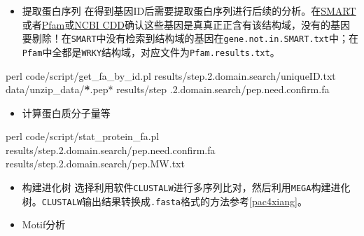\documentclass[
  10pt,
]{book}
\newenvironment{Shaded}{\begin{snugshade}}{\end{snugshade}}
\newcommand{\ErrorTok}[1]{\textcolor[rgb]{0.64,0.00,0.00}{\textbf{#1}}}
\newcommand{\FloatTok}[1]{\textcolor[rgb]{0.00,0.00,0.81}{#1}}
\newcommand{\NormalTok}[1]{#1}
\newcommand{\SpecialCharTok}[1]{\textcolor[rgb]{0.00,0.00,0.00}{#1}}
\providecommand{\tightlist}{%
  \setlength{\itemsep}{0pt}\setlength{\parskip}{0pt}}
\begin{document}
\begin{itemize}
\tightlist
\item
  提取蛋白序列
  在得到基因ID后需要提取蛋白序列进行后续的分析。在\href{http://smart.embl.de/}{SMART}或者\href{http://pfam.xfam.org/search}{Pfam}或\href{https://www.ncbi.nlm.nih.gov/cdd/}{NCBI CDD}确认这些基因是真真正正含有该结构域，没有的基因要剔除！在\texttt{SMART}中没有检索到结构域的基因在\texttt{gene.not.in.SMART.txt}中；在\texttt{Pfam}中全都是\texttt{WRKY}结构域，对应文件为\texttt{Pfam.results.txt}。
\end{itemize}

\begin{Shaded}
\begin{Highlighting}[]
\NormalTok{perl code}\SpecialCharTok{/}\NormalTok{script}\SpecialCharTok{/}\NormalTok{get\_fa\_by\_id.pl results}\SpecialCharTok{/}\NormalTok{step.}\FloatTok{2.}\NormalTok{domain.search}\SpecialCharTok{/}\NormalTok{uniqueID.txt data}\SpecialCharTok{/}\NormalTok{unzip\_data}\SpecialCharTok{/}\ErrorTok{*}\NormalTok{.pep}\SpecialCharTok{*}\NormalTok{ results}\SpecialCharTok{/}\NormalTok{step}
\NormalTok{.}\FloatTok{2.}\NormalTok{domain.search}\SpecialCharTok{/}\NormalTok{pep.need.confirm.fa}
\end{Highlighting}
\end{Shaded}

\begin{itemize}
\tightlist
\item
  计算蛋白质分子量等
\end{itemize}

\begin{Shaded}
\begin{Highlighting}[]
\NormalTok{perl code}\SpecialCharTok{/}\NormalTok{script}\SpecialCharTok{/}\NormalTok{stat\_protein\_fa.pl results}\SpecialCharTok{/}\NormalTok{step.}\FloatTok{2.}\NormalTok{domain.search}\SpecialCharTok{/}\NormalTok{pep.need.confirm.fa results}\SpecialCharTok{/}\NormalTok{step.}\FloatTok{2.}\NormalTok{domain.search}\SpecialCharTok{/}\NormalTok{pep.MW.txt}
\end{Highlighting}
\end{Shaded}

\begin{itemize}
\tightlist
\item
  构建进化树
  选择利用软件\texttt{CLUSTALW}进行多序列比对，然后利用\texttt{MEGA}构建进化树。\texttt{CLUSTALW}输出结果转换成\texttt{.fasta}格式的方法参考\ref{pac4xiang}。
\item
  Motif分析
\end{itemize}
\end{document}
